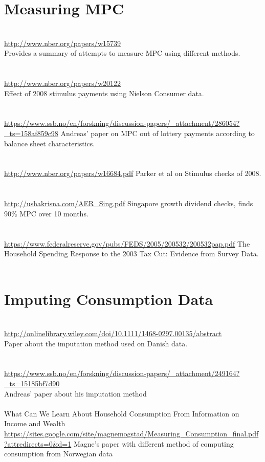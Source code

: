 \documentclass[titlepage,abstract]{econtex}
\begin{document}
\section{Measuring MPC}
\cite{jappelli_consumption_2010} \\
\href{url}{http://www.nber.org/papers/w15739} \\
Provides a summary of attempts to measure MPC using different methods.\\
\\
\cite{broda_economic_2014} \\
\href{url}{http://www.nber.org/papers/w20122} \\
Effect of 2008 stimulus payments using Nielson Consumer data.\\
\\
\cite{fagereng_mpc_2016}\\
\href{url}{https://www.ssb.no/en/forskning/discussion-papers/\_attachment/286054?\_ts=158af859c98}
Andreas' paper on MPC out of lottery payments according to balance sheet characteristics.\\
\\
\cite{parker_consumer_2013}\\
\href{url}{http://www.nber.org/papers/w16684.pdf}
Parker et al on Stimulus checks of 2008.\\
\\
\cite{agarwal_consumption_2014}\\
\href{url}{http://ushakrisna.com/AER\_Sing.pdf}
Singapore growth dividend checks, finds 90\% MPC over 10 months.\\
\\
\cite{lupton_household_2005}\\
\href{url}{https://www.federalreserve.gov/pubs/FEDS/2005/200532/200532pap.pdf}
The Household Spending Response to the 2003 Tax Cut: Evidence from Survey Data.\\
\\


\section{Imputing Consumption Data}
\cite{browning_imputing_2003} \\
\href{url}{http://onlinelibrary.wiley.com/doi/10.1111/1468-0297.00135/abstract} \\
Paper about the imputation method used on Danish data.\\
\\
\cite{fagereng_imputing_2015} \\
\href{url}{https://www.ssb.no/en/forskning/discussion-papers/\_attachment/249164?\_ts=15185bf7d90} \\
Andreas' paper about his imputation method \\
\\
What Can We Learn About Household Consumption From Information on Income and Wealth \\
\href{url}{https://sites.google.com/site/magnemogstad/Measuring\_Consumption\_final.pdf?attredirects=0\&d=1}
Magne's paper with different method of computing consumption from Norwegian data\\
\\
\end{document}
